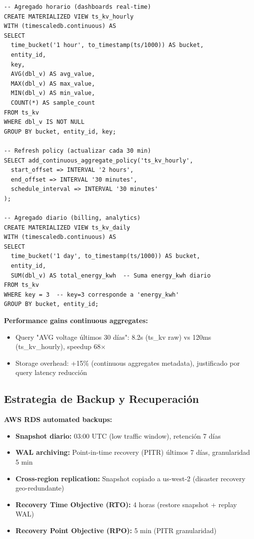 \begin{verbatim}
-- Agregado horario (dashboards real-time)
CREATE MATERIALIZED VIEW ts_kv_hourly
WITH (timescaledb.continuous) AS
SELECT 
  time_bucket('1 hour', to_timestamp(ts/1000)) AS bucket,
  entity_id,
  key,
  AVG(dbl_v) AS avg_value,
  MAX(dbl_v) AS max_value,
  MIN(dbl_v) AS min_value,
  COUNT(*) AS sample_count
FROM ts_kv
WHERE dbl_v IS NOT NULL
GROUP BY bucket, entity_id, key;

-- Refresh policy (actualizar cada 30 min)
SELECT add_continuous_aggregate_policy('ts_kv_hourly',
  start_offset => INTERVAL '2 hours',
  end_offset => INTERVAL '30 minutes',
  schedule_interval => INTERVAL '30 minutes'
);

-- Agregado diario (billing, analytics)
CREATE MATERIALIZED VIEW ts_kv_daily
WITH (timescaledb.continuous) AS
SELECT 
  time_bucket('1 day', to_timestamp(ts/1000)) AS bucket,
  entity_id,
  SUM(dbl_v) AS total_energy_kwh  -- Suma energy_kwh diario
FROM ts_kv
WHERE key = 3  -- key=3 corresponde a 'energy_kwh'
GROUP BY bucket, entity_id;
\end{verbatim}

\textbf{Performance gains continuous aggregates:}

\begin{itemize}
    \item Query "AVG voltage últimos 30 días": 8.2s (ts\_kv raw) vs 120ms (ts\_kv\_hourly), speedup 68$\times$~\cite{freedmanTimescaleDBSQLMade2024}
    \item Storage overhead: +15\% (continuous aggregates metadata), justificado por query latency reducción
\end{itemize}

\subsection{Estrategia de Backup y Recuperación}
\label{sec:server-backup}

\textbf{AWS RDS automated backups:}

\begin{itemize}
    \item \textbf{Snapshot diario:} 03:00 UTC (low traffic window), retención 7 días
    \item \textbf{WAL archiving:} Point-in-time recovery (PITR) últimos 7 días, granularidad 5 min
    \item \textbf{Cross-region replication:} Snapshot copiado a us-west-2 (disaster recovery geo-redundante)
    \item \textbf{Recovery Time Objective (RTO):} 4 horas (restore snapshot + replay WAL)
    \item \textbf{Recovery Point Objective (RPO):} 5 min (PITR granularidad)
\end{itemize}

